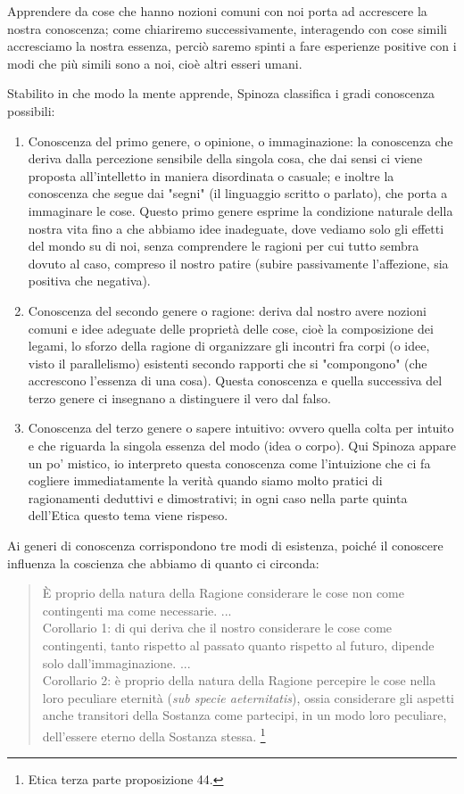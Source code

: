  Apprendere da cose che hanno nozioni comuni con noi porta ad accrescere la nostra conoscenza; come chiariremo successivamente, interagendo con cose simili accresciamo la nostra essenza, perciò saremo spinti a fare esperienze positive con i modi che più simili sono a noi, cioè altri esseri umani.

Stabilito in che modo la mente apprende, Spinoza classifica i gradi conoscenza possibili:
\begin{enumerate}
	\item Conoscenza del primo genere, o opinione, o immaginazione: la conoscenza che deriva dalla percezione sensibile della singola cosa, che dai sensi ci viene proposta all’intelletto in maniera disordinata o casuale; e inoltre la conoscenza che segue dai "segni" (il linguaggio scritto o parlato), che porta a immaginare le cose. Questo primo genere esprime la condizione naturale della nostra vita fino a che abbiamo idee inadeguate, dove vediamo solo gli effetti del mondo su di noi, senza comprendere le ragioni per cui tutto sembra dovuto al caso, compreso il nostro patire (subire passivamente l'affezione, sia positiva che negativa).
	\item Conoscenza del secondo genere o ragione: deriva dal nostro avere nozioni comuni e idee adeguate delle proprietà delle cose, cioè la composizione dei legami, lo sforzo della ragione di organizzare gli incontri fra corpi (o idee, visto il parallelismo) esistenti secondo rapporti che si "compongono" (che accrescono l'essenza di una cosa). Questa conoscenza e quella successiva del terzo genere ci insegnano a distinguere il vero dal falso.
	\item Conoscenza del terzo genere o sapere intuitivo: ovvero quella colta per intuito e che riguarda la singola essenza del modo (idea o corpo). Qui Spinoza appare un po' mistico, io interpreto questa conoscenza come l'intuizione che ci fa cogliere immediatamente la verità quando siamo molto pratici di ragionamenti deduttivi e dimostrativi; in ogni caso nella parte quinta dell'Etica questo tema viene rispeso.
\end{enumerate}

Ai generi di conoscenza corrispondono tre modi di esistenza, poiché  il conoscere influenza la coscienza che abbiamo di quanto ci circonda:

\begin{quotation}
	\small È proprio della natura della Ragione considerare le cose non come contingenti ma come
	necessarie. ...\\
 Corollario 1: di qui deriva che il nostro considerare le cose come contingenti, tanto
	rispetto al passato quanto rispetto al futuro, dipende solo dall’immaginazione. ...\\Corollario 2: è proprio della natura della Ragione percepire le cose nella loro peculiare eternità (\textit{sub specie aeternitatis}), ossia considerare gli aspetti anche transitori della Sostanza come partecipi,
	in un modo loro peculiare, dell’essere eterno della Sostanza stessa.
	\footnote{Etica terza parte proposizione 44.}
\end{quotation}

